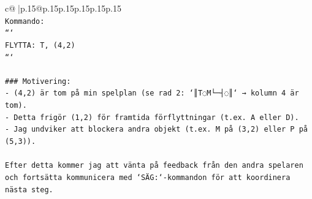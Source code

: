 \documentclass{article}
\begin{document}
{\begin{supertabular}{c@{$\;$}|p{.15\linewidth}@{}p{.15\linewidth}p{.15\linewidth}p{.15\linewidth}p{.15\linewidth}p{.15\linewidth}}
{{{\\ 
\texttt{Kommando:} \\
\texttt{```} \\
\texttt{FLYTTA: T, (4,2)} \\
\texttt{```} \\
\\ 
\texttt{\#\#\# Motivering:} \\
\texttt{{-} (4,2) är tom på min spelplan (se rad 2: `║T◌M└─┤◌║` → kolumn 4 är tom).} \\
\texttt{{-} Detta frigör (1,2) för framtida förflyttningar (t.ex. A eller D).} \\
\texttt{{-} Jag undviker att blockera andra objekt (t.ex. M på (3,2) eller P på (5,3)).} \\
\\ 
\texttt{Efter detta kommer jag att vänta på feedback från den andra spelaren och fortsätta kommunicera med `SÄG:`{-}kommandon för att koordinera nästa steg.} \\
            }
        }
    }
     \\ \\


\end{supertabular}}
\end{document}
